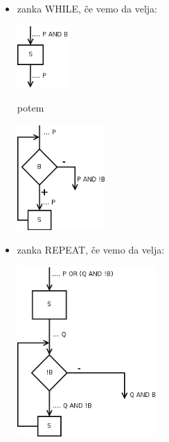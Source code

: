 \documentclass[a4paper,10pt]{article}
\begin{document}
\begin{itemize}
\item zanka WHILE, \v ce vemo da velja:
	\begin{center}
	\includegraphics[width=1.95cm,height=2.4cm]{Slike/ZankaWHILE1.png}
	\end{center}
potem
	\begin{center}
	\includegraphics[width=3.35cm,height=4.05cm]{Slike/ZankaWHILE2.png}
	\end{center}
\item zanka REPEAT, \v ce vemo da velja:
	\begin{center}
	\includegraphics[width=5.3cm,height=6.5cm]{Slike/ZankaREPEAT.png}
	\end{center}
\end{itemize}
\end{document}
